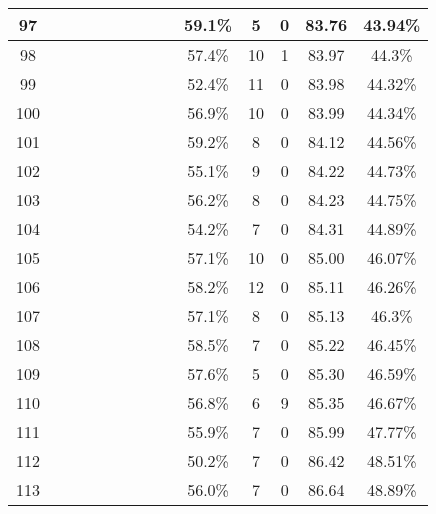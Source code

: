 \begin{longtable}{|c|c|c|c|c|c|c|c|c|c|c|c|c|c|}
97 &  \x    & \x    & \x    & \x    & \x    &       & \x\m  &       & 59.1\% &  5  & 0  & 83.76 & 43.94\% \\ \hline
98 &  \x    & \x    &       &       & \x    & \x    & \x    &       & 57.4\% &  10 & 1  & 83.97 & 44.3\% \\ \hline
99 &  \x    & \x    &       & \x    &       & \x    &       &       & 52.4\% &  11 & 0  & 83.98 & 44.32\% \\ \hline
100 &  \x    & \x    & \x    &       &       &       & \x\m  &       & 56.9\% &  10 & 0  & 83.99 & 44.34\% \\ \hline
101 &  \x    & \x    & \x    & \x    & \x    & \x\m  & \x\m  &       & 59.2\% &  8  & 0  & 84.12 & 44.56\% \\ \hline
102 &  \x    & \x    & \x    &       &       & \x    &       & \x    & 55.1\% &  9  & 0  & 84.22 & 44.73\% \\ \hline
103 &  \x    & \x    & \x    & \x    &       & \x    &       & \x\m  & 56.2\% &  8  & 0  & 84.23 & 44.75\% \\ \hline
104 &  \x    & \x    & \x    &       &       & \x    &       &       & 54.2\% &  7  & 0  & 84.31 & 44.89\% \\ \hline
105 &  \x    & \x    & \x    & \x    &       & \x\m  & \x    &       & 57.1\% &  10 & 0  & 85.00 & 46.07\% \\ \hline
106 &  \x    & \x    &       & \x    & \x    &       &       &       & 58.2\% &  12 & 0  & 85.11 & 46.26\% \\ \hline
107 &  \x    & \x    & \x    & \x    &       & \x\m  &       &       & 57.1\% &  8  & 0  & 85.13 & 46.3\% \\ \hline
108 &  \x    & \x    & \x    & \x    &       & \x    & \x\m  &       & 58.5\% &  7  & 0  & 85.22 & 46.45\% \\ \hline
109 &  \x    & \x    &       & \x    & \x    &       & \x    &       & 57.6\% &  5  & 0  & 85.30 & 46.59\% \\ \hline
110 &  \x    & \x    & \x    &       &       & \x\m  & \x\m  &       & 56.8\% &  6  & 9  & 85.35 & 46.67\% \\ \hline
111 &  \x    & \x    & \x    &       &       & \x\m  &       & \x    & 55.9\% &  7  & 0  & 85.99 & 47.77\% \\ \hline
112 &  \x    & \x    &       &       &       & \x\m  &       & \x\m  & 50.2\% &  7  & 0  & 86.42 & 48.51\% \\ \hline
113 &  \x    & \x    & \x    &       &       &       &       & \x    & 56.0\% &  7  & 0  & 86.64 & 48.89\% \\ \hline

\end{longtable}
